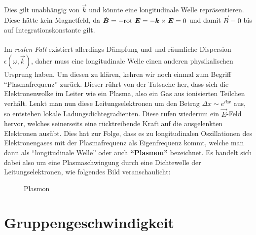 \ \\
Dies gilt unabhängig von $\vec{k}$ und könnte eine longitudinale Welle repräsentieren. Diese hätte kein Magnetfeld, da $\dot{\bm{B}}= - \text{rot }\bm{E} = - \bm{k}\times\bm{E}= 0$ und damit $\vec{B}=0$ bis auf Integrationskonstante gilt.\\
\ \\
Im \emph{realen Fall} existiert allerdings Dämpfung und und räumliche Dispersion $\epsilon(\omega,\vec{k})$, daher muss eine longitudinale Welle einen anderen physikalischen Ursprung haben. Um diesen zu klären, kehren wir noch einmal zum Begriff "`Plasmafrequenz"' zurück.  Dieser rührt von der Tatsache her, dass sich die Elektronenwolke im Leiter wie ein Plasma, also ein Gas aus ionisierten Teilchen verhält. Lenkt man nun diese Leitungselektronen um den Betrag $\Delta x \sim e^{ikx}$ aus, so entstehen lokale Ladungsdichtegradienten. Diese rufen wiederum ein $\vec{E}$-Feld hervor, welches seinerseits eine rücktreibende Kraft auf die ausgelenkten Elektronen ausübt. Dies hat zur Folge, dass es zu longitudinalen Oszillationen des Elektronengases mit der Plasmafrequenz als Eigenfrequenz kommt, welche man dann als "`longitudinale Welle"' oder auch \textbf{"`Plasmon"'} bezeichnet. 
\newpage
Es handelt sich dabei also um eine Plasmaschwingung durch eine Dichtewelle der Leitungselektronen, wie folgendes Bild veranschaulicht:


\begin{figure}[ht]
\centering
\colorbox{hgrey}{
	}
\caption{Plasmon}
\end{figure}

\section{Gruppengeschwindigkeit}

